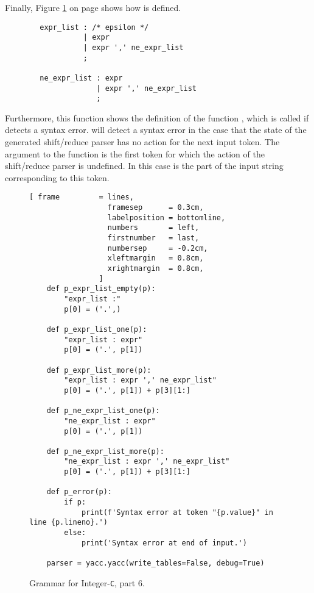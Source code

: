 \noindent
Finally, Figure \ref{fig:Compiler.ipynb-6} on page \pageref{fig:Compiler.ipynb-6} shows how 
is defined.  
\begin{verbatim}
        expr_list : /* epsilon */
                  | expr
                  | expr ',' ne_expr_list
                  ;

        ne_expr_list : expr
                     | expr ',' ne_expr_list
                     ;
\end{verbatim}
Furthermore, this function shows the definition of the function , which is called if
 detects a syntax error.   will detect a syntax error in the case that the state of the
generated shift/reduce parser has no action for the next input token.  The argument  to the function
 is the first token for which the action of the shift/reduce parser is undefined.
In this case  is the part of the input string corresponding to this token.

\begin{figure}[!ht]
\centering
\begin{Verbatim}[ frame         = lines, 
                  framesep      = 0.3cm, 
                  labelposition = bottomline,
                  numbers       = left,
                  firstnumber   = last,
                  numbersep     = -0.2cm,
                  xleftmargin   = 0.8cm,
                  xrightmargin  = 0.8cm,
                ]
    def p_expr_list_empty(p):
        "expr_list :"
        p[0] = ('.',)
        
    def p_expr_list_one(p):
        "expr_list : expr"
        p[0] = ('.', p[1])     
    
    def p_expr_list_more(p):
        "expr_list : expr ',' ne_expr_list"
        p[0] = ('.', p[1]) + p[3][1:]     
    
    def p_ne_expr_list_one(p):
        "ne_expr_list : expr"
        p[0] = ('.', p[1]) 
        
    def p_ne_expr_list_more(p):
        "ne_expr_list : expr ',' ne_expr_list"
        p[0] = ('.', p[1]) + p[3][1:] 
    
    def p_error(p):
        if p:
            print(f'Syntax error at token "{p.value}" in line {p.lineno}.')
        else:
            print('Syntax error at end of input.')
    
    parser = yacc.yacc(write_tables=False, debug=True)
\end{Verbatim}
\vspace*{-0.3cm}
\caption{Grammar for Integer-\texttt{C}, part 6.}
\label{fig:Compiler.ipynb-6}
\end{figure}

